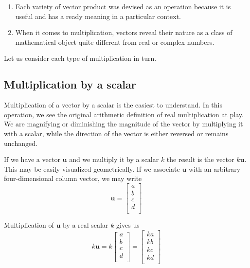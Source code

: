 \documentclass[
  a4paper,
]{article}
\begin{document}
\begin{enumerate}
\def\labelenumi{\arabic{enumi}.}
\setcounter{enumi}{3}
\item
  Each variety of vector product was devised as an operation because it
  is useful and has a ready meaning in a particular context.
\item
  When it comes to multiplication, vectors reveal their nature as a
  class of mathematical object quite different from real or complex
  numbers.
\end{enumerate}

Let us consider each type of multiplication in turn.

\hypertarget{multiplication-by-a-scalar}{%
\subsection{Multiplication by a
scalar}\label{multiplication-by-a-scalar}}

Multiplication of a vector by a scalar is the easiest to understand. In
this operation, we see the original arithmetic definition of real
multiplication at play. We are magnifying or diminishing the magnitude
of the vector by multiplying it with a scalar, while the direction of
the vector is either reversed or remains unchanged.

If we have a vector \(\mathbf{u}\) and we multiply it by a scalar \(k\)
the result is the vector \(k\mathbf{u}\). This may be easily visualized
geometrically. If we associate \(\mathbf{u}\) with an arbitrary
four-dimensional column vector, we may write \[
\mathbf{u} = \begin{bmatrix}a\\b\\c\\d\\\end{bmatrix}
\]

Multiplication of \(\mathbf{u}\) by a real scalar \(k\) gives us \[
k\mathbf{u} = k\begin{bmatrix}a\\b\\c\\d\\\end{bmatrix} = \begin{bmatrix}ka\\kb\\kc\\kd\\\end{bmatrix}
\]
\end{document}
